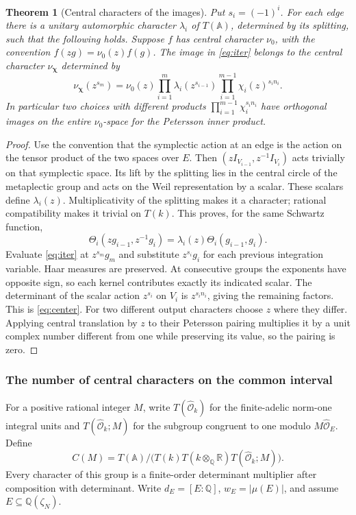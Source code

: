 \documentclass[a4paper,11pt]{article}
\newtheorem{theorem}[proposition]{Theorem}
\theoremstyle{definition}
\theoremstyle{remark}
\newcommand{\RR}{\mathbb R}\newcommand{\CC}{\mathbb C}\newcommand{\QQ}{\mathbb Q}
\numberwithin{equation}{section}
\newcommand{\OO}{\mathcal O}
\begin{document}
\begin{theorem}[Central characters of the images]\label{thm:center}
Put \(s_i=(-1)^i\). For each edge there is a unitary automorphic character \(\lambda_i\) of \(T(\mathbb A)\), determined by its splitting, such that the following holds. Suppose \(f\) has central character \(\nu_0\), with the convention \(f(zg)=\nu_0(z)f(g)\). The image in \eqref{eq:iter} belongs to the central character \(\nu_{\boldsymbol\chi}\) determined by
\begin{equation}
 \nu_{\boldsymbol\chi}(z^{s_m})
    =\nu_0(z)\prod_{i=1}^{m}\lambda_i(z^{s_{i-1}})
                    \prod_{i=1}^{m-1}\chi_i(z)^{s_i n_i}.
 \label{eq:center}
\end{equation}
In particular two choices with different products \(\prod_{i=1}^{m-1}\chi_i^{s_i n_i}\) have orthogonal images on the entire \(\nu_0\)-space for the Petersson inner product.
\end{theorem}
\begin{proof}
Use the convention that the symplectic action at an edge is the action on the tensor product of the two spaces over \(E\). Then \((zI_{V_{i-1}},z^{-1}I_{V_i})\) acts trivially on that symplectic space. Its lift by the splitting lies in the central circle of the metaplectic group and acts on the Weil representation by a scalar. These scalars define \(\lambda_i(z)\). Multiplicativity of the splitting makes it a character; rational compatibility makes it trivial on \(T(k)\). This proves, for the same Schwartz function,
\[
 \Theta_i(zg_{i-1},z^{-1}g_i)=\lambda_i(z)\Theta_i(g_{i-1},g_i).
\]
Evaluate \eqref{eq:iter} at \(z^{s_m}g_m\) and substitute \(z^{s_i}g_i\) for each previous integration variable. Haar measures are preserved. At consecutive groups the exponents have opposite sign, so each kernel contributes exactly its indicated scalar. The determinant of the scalar action \(z^{s_i}\) on \(V_i\) is \(z^{s_i n_i}\), giving the remaining factors. This is \eqref{eq:center}. For two different output characters choose \(z\) where they differ. Applying central translation by \(z\) to their Petersson pairing multiplies it by a unit complex number different from one while preserving its value, so the pairing is zero.
\end{proof}

\subsubsection{The number of central characters on the common interval}\label{nav:I-41}
For a positive rational integer \(M\), write \(T(\widehat{\OO}_k)\) for the finite-adelic norm-one integral units and \(T(\widehat{\OO}_k;M)\) for the subgroup congruent to one modulo \(M\widehat{\OO}_E\). Define
\[
 C(M)=T(\mathbb A)\big/\big(T(k)T(k\otimes_\QQ\RR)T(\widehat{\OO}_k;M)\big).
\]
Every character of this group is a finite-order determinant multiplier after composition with determinant. Write \(d_E=[E:\QQ]\), \(w_E=|\mu(E)|\), and assume \(E\subseteq\QQ(\zeta_N)\).
\end{document}
